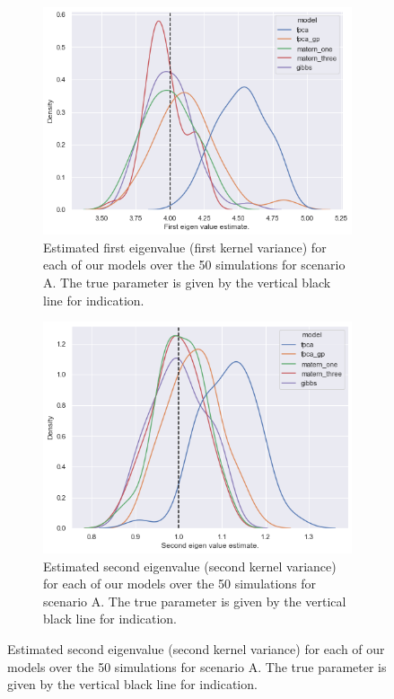 \begin{figure}
	\centering
	\begin{subfigure}[b]{0.45\textwidth}
 		\includegraphics[width=\textwidth]{lambda_1_param_A}
 		\caption{Estimated first eigenvalue (first kernel variance) for each of our models over the 50 simulations for scenario A. The true parameter is given by the vertical black line for indication.}
 		\label{fig:lambda_1_param_A}
	\end{subfigure}
	\hfill
	\begin{subfigure}[b]{0.45\textwidth}
 		\includegraphics[width=\textwidth]{lambda_2_param_A}
 		\caption{Estimated second eigenvalue (second kernel variance) for each of our models over the 50 simulations for scenario A. The true parameter is given by the vertical black line for indication.}
 		\label{fig:lambda_2_param_A}
	\end{subfigure}
\end{figure}

